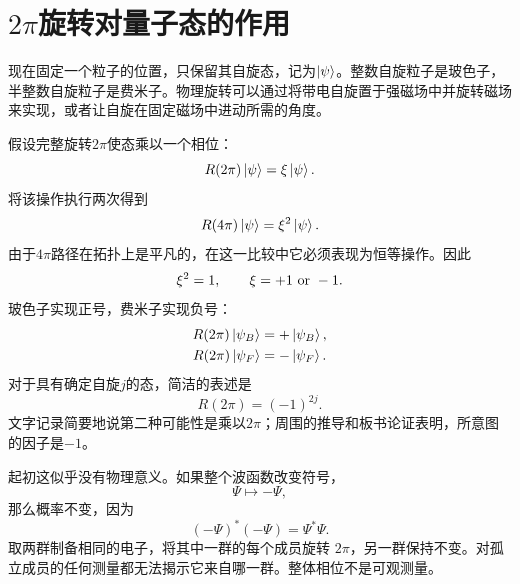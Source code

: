 
\section{\texorpdfstring{\(2\pi\)}{2 pi}旋转对量子态的作用}

现在固定一个粒子的位置，只保留其自旋态，记为\(\left\lvert\psi\right\rangle\)。整数自旋粒子是玻色子，半整数自旋粒子是费米子。物理旋转可以通过将带电自旋置于强磁场中并旋转磁场来实现，或者让自旋在固定磁场中进动所需的角度。

\begin{classroomqa}
\end{classroomqa}

假设完整旋转\(2\pi\)使态乘以一个相位：
\begin{equation}
R(2\pi)\left\lvert\psi\right\rangle=\xi\left\lvert\psi\right\rangle.
\end{equation}
将该操作执行两次得到
\begin{equation}
R(4\pi)\left\lvert\psi\right\rangle=\xi^2\left\lvert\psi\right\rangle.
\end{equation}
由于\(4\pi\)路径在拓扑上是平凡的，在这一比较中它必须表现为恒等操作。因此
\begin{equation}
\xi^2=1,
\qquad
\xi=+1\ \hbox{or}\ -1.
\end{equation}
玻色子实现正号，费米子实现负号：
\begin{align}
R(2\pi)\left\lvert\psi_B\right\rangle&=+\left\lvert\psi_B\right\rangle,\\
R(2\pi)\left\lvert\psi_F\right\rangle&=-\left\lvert\psi_F\right\rangle.
\end{align}
对于具有确定自旋\(j\)的态，简洁的表述是
\begin{equation}
R(2\pi)=(-1)^{2j}.
\end{equation}
文字记录简要地说第二种可能性是乘以\(2\pi\)；周围的推导和板书论证表明，所意图的因子是\(-1\)。

起初这似乎没有物理意义。如果整个波函数改变符号，
\begin{equation}
\Psi\longmapsto-\Psi,
\end{equation}
那么概率不变，因为
\begin{equation}
(-\Psi)^*(-\Psi)=\Psi^*\Psi.
\end{equation}
取两群制备相同的电子，将其中一群的每个成员旋转 \(2\pi\)，另一群保持不变。对孤立成员的任何测量都无法揭示它来自哪一群。整体相位不是可观测量。

